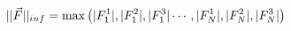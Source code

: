 \documentclass[preview]{standalone}
\begin{document}
\begin{varwidth}{50in}
  \begin{equation}
    || \vec{F} ||_{inf} 
    = {\rm max}\left(|F_1^1|, |F_1^2|, |F_1^3| \cdots, 
    |F_N^1|, |F_N^2|, |F_N^3|\right)
    \nonumber
  \end{equation}
\end{varwidth}
\end{document}
